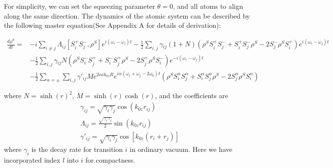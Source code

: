 \documentclass[aps,showpacs,twocolumn,twoside,groupedaddress]{revtex4}
\begin{document}
For simplicity, we can set the squeezing parameter $\theta=0$, and all atoms to align along the same direction. The dynamics of the atomic system can be described by the following master equation(See Appendix A for details of derivation):
\begin{widetext}
\begin{equation}
\label{eq1}
\begin{split}
\frac{d\rho^{S}}{dt}=&-i\underset{i\neq j}{\sum}\Lambda_{ij}[S_{i}^{+}S_{j}^{-},\rho^{S}]e^{i(\omega_{i}-\omega_{j})t}-\frac{1}{2}\underset{i,j}{\sum}\gamma{}_{ij}(1+N)(\rho^{S}S_{i}^{+}S_{j}^{-}+S_{i}^{+}S_{j}^{-}\rho^{S}-2S_{j}^{-}\rho^{S}S_{i}^{+})e^{i(\omega_{i}-\omega_{j})t} \\
&-\frac{1}{2}\underset{i,j}{\sum}\gamma{}_{ij}N(\rho^{S}S_{i}^{-}S_{j}^{+}+S_{i}^{-}S_{j}^{+}\rho^{S}-2S_{j}^{+}\rho^{S}S_{i}^{-})e^{-i(\omega_{i}-\omega_{j})t}\\
&-\frac{1}{2}\sum_{\alpha=\pm}\underset{i,j}{\sum}\gamma'_{ij}Me^{2\alpha ik_{0z}R}e^{i\alpha(\omega_i+\omega_j-2\omega_0)t}(\rho^{S}S_{i}^{\alpha}S_{j}^{\alpha}+S_{i}^{\alpha}S_{j}^{\alpha}\rho^{S}-2S_{j}^{\alpha}\rho^{S}S_{i}^{\alpha})
\end{split}
\end{equation}
\end{widetext}
where $N=\sinh(r)^2$, $M=\sinh(r)\cosh(r)$, and the coefficients are
\begin{equation}
\label{eq2}
\begin{split}
& \gamma_{ij}=\sqrt{\gamma_{i}\gamma_{j}}\cos(k_{0z}r_{ij}) \\
& \Lambda_{ij}=\frac{\sqrt{\gamma_{i}\gamma_{j}}}{2}\sin(k_{0z}r_{ij})\\
& \gamma'_{ij}=\sqrt{\gamma_{i}\gamma_{j}}\cos[k_{0z}(r_{i}+r_{j})]
\end{split}
\end{equation}
where $\gamma_{i}$ is the decay rate for transition $i$ in ordinary vacuum. Here we have incorporated index $l$ into $i$ for compactness.
\end{document}
